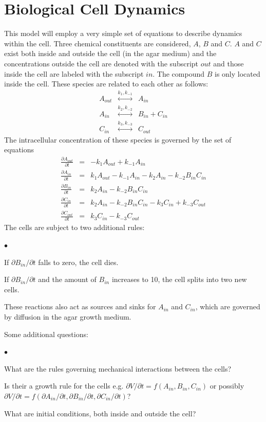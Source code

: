 \documentclass[12pt]{article}
\begin{document}
\section{Biological Cell Dynamics}
This model will employ a very simple set of equations to describe dynamics within the
cell. Three chemical constituents are considered, $A$, $B$ and $C$. $A$ and $C$ exist
both inside and outside the cell (in the agar medium) and the concentrations outside
the cell are denoted with the subscript $out$ and those inside the cell are labeled
with the subscript $in$. The compound $B$ is only located inside the cell. These species
are related to each other as follows:
\begin{eqnarray*}
A_{out} &\stackrel{k_{1},k_{-1}}{\longleftrightarrow}& A_{in} \\
A_{in} &\stackrel{k_2,k_{-2}}{\longleftrightarrow}& B_{in} + C_{in} \\
C_{in} &\stackrel{k_3,k_{-3}}{\longleftrightarrow}& C_{out}
\end{eqnarray*}
The intracellular concentration of these species is governed by the set of equations
\begin{eqnarray*}
\frac{\partial A_{out}}{\partial t} &=&-k_1 A_{out}+k_{-1} A_{in} \\
\frac{\partial A_{in}}{\partial t} &=&k_1 A_{out}-k_{-1} A_{in} - k_2 A_{in}
 - k_{-2}B_{in}C_{in}\\
\frac{\partial B_{in}}{\partial t} &=&k_2 A_{in} - k_{-2}B_{in}C_{in}\\
\frac{\partial C_{in}}{\partial t} &=&k_2 A_{in} - k_{-2}B_{in}C_{in}-k_3 C_{in}
+ k_{-3} C_{out} \\
\frac{\partial C_{out}}{\partial t} &=&k_3 C_{in}-k_{-3} C_{out}
\end{eqnarray*}
The cells are subject to two additional rules:
\begin{list}{$\bullet$}{}
\item If $\partial B_{in}/\partial t$ falls to zero, the cell dies.
\item If $\partial B_{in}/\partial t$ and the amount of $B_{in}$ increases to 10, the
cell splits into two new cells.
\end{list}
These reactions also act as sources and sinks for $A_{in}$ and $C_{in}$, which are governed
by diffusion in the agar growth medium.

Some additional questions:
\begin{list}{$\bullet$}{}
\item What are the rules governing mechanical interactions between the cells?
\item Is their a growth rule for the cells e.g. $\partial V/\partial t = f(A_{in},
B_{in},C_{in})$ or possibly $\partial V/\partial t = f(\partial A_{in}/\partial t,
\partial B_{in}/\partial t, \partial C_{in}/\partial t)$?
\item What are initial conditions, both inside and outside the cell?
\end{list}
\end{document}
